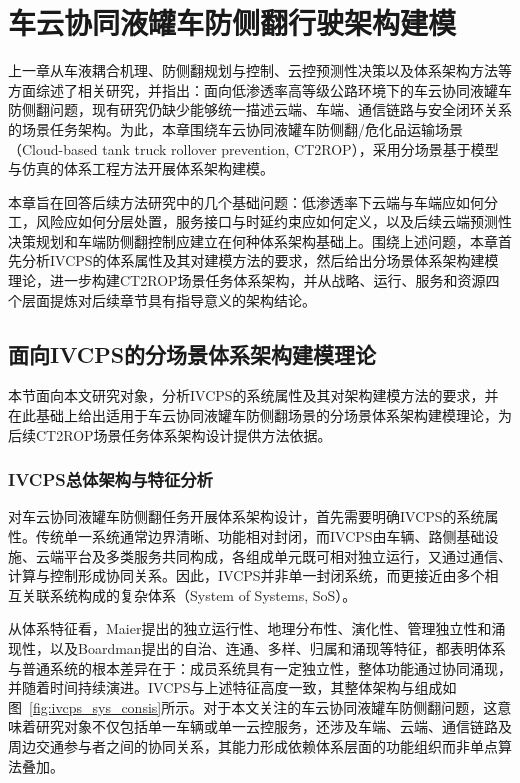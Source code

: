 
\chapter{车云协同液罐车防侧翻行驶架构建模}
\label{chap:architecture}

上一章从车液耦合机理、防侧翻规划与控制、云控预测性决策以及体系架构方法等方面综述了相关研究，并指出：面向低渗透率高等级公路环境下的车云协同液罐车防侧翻问题，现有研究仍缺少能够统一描述云端、车端、通信链路与安全闭环关系的场景任务架构。为此，本章围绕车云协同液罐车防侧翻/危化品运输场景（Cloud-based tank truck rollover prevention, CT2ROP），采用分场景基于模型与仿真的体系工程方法开展体系架构建模。

本章旨在回答后续方法研究中的几个基础问题：低渗透率下云端与车端应如何分工，风险应如何分层处置，服务接口与时延约束应如何定义，以及后续云端预测性决策规划和车端防侧翻控制应建立在何种体系架构基础上。围绕上述问题，本章首先分析IVCPS的体系属性及其对建模方法的要求，然后给出分场景体系架构建模理论，进一步构建CT2ROP场景任务体系架构，并从战略、运行、服务和资源四个层面提炼对后续章节具有指导意义的架构结论。


\section{面向IVCPS的分场景体系架构建模理论}

  本节面向本文研究对象，分析IVCPS的系统属性及其对架构建模方法的要求，并在此基础上给出适用于车云协同液罐车防侧翻场景的分场景体系架构建模理论，为后续CT2ROP场景任务体系架构设计提供方法依据。

  \subsection{IVCPS总体架构与特征分析}

    对车云协同液罐车防侧翻任务开展体系架构设计，首先需要明确IVCPS的系统属性。传统单一系统通常边界清晰、功能相对封闭，而IVCPS由车辆、路侧基础设施、云端平台及多类服务共同构成，各组成单元既可相对独立运行，又通过通信、计算与控制形成协同关系。因此，IVCPS并非单一封闭系统，而更接近由多个相互关联系统构成的复杂体系（System of Systems, SoS）\cite{fengyimin2024soseframework}。

    从体系特征看，Maier提出的独立运行性、地理分布性、演化性、管理独立性和涌现性\cite{maier1996sosprinciples}，以及Boardman提出的自治、连通、多样、归属和涌现等特征\cite{boardman2006meaningof}，都表明体系与普通系统的根本差异在于：成员系统具有一定独立性，整体功能通过协同涌现，并随着时间持续演进。IVCPS与上述特征高度一致，其整体架构与组成如图~\ref{fig:ivcps_sys_consis}所示。对于本文关注的车云协同液罐车防侧翻问题，这意味着研究对象不仅包括单一车辆或单一云控服务，还涉及车端、云端、通信链路及周边交通参与者之间的协同关系，其能力形成依赖体系层面的功能组织而非单点算法叠加。

